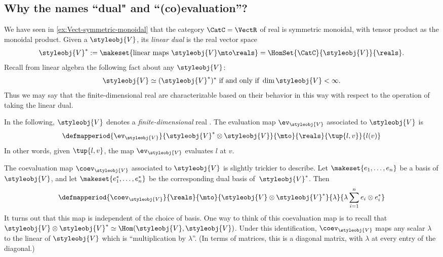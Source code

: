 \subsection{Why the names ``dual" and ``(co)evaluation''?}

We have seen in \cref{ex:Vect-symmetric-monoidal} that the category $\CatC = \VectR$ of real  is symmetric monoidal, with tensor product as the monoidal product.
Given a  $\styleobj{V} $, its \emph{linear dual} is the real vector space
\begin{equation}
    \label{eq:lin-dual-vecsp}
    \styleobj{V} ^{*} := \makeset{ \text{linear maps } \styleobj{V} \mto \reals } = \HomSet{\CatC}{\styleobj{V}}{ \reals}.
\end{equation}
%
Recall from linear algebra the following fact about any  $\styleobj{V} $:
%
\begin{equation}
    \label{eq:double-dual-fin-dim}
    \styleobj{V} \simeq (\styleobj{V} ^{*})^* \text{ if and only if } \dim \styleobj{V} < \infty.
\end{equation}
%
Thus we may say that the finite-dimensional real  are characterizable based on their behavior in this way with respect to the operation of taking the linear dual. 


In the following, $\styleobj{V} $ denotes a \emph{finite-dimensional} real .
The evaluation map $\ev_\styleobj{V} $ associated to $\styleobj{V} $ is
\begin{equation}
    \label{eq:evaluation-vecsp}
    \defmapperiod{
        \ev_\styleobj{V}
    }{
        \styleobj{V}^* \otimes \styleobj{V}
    }{
        \mto
    }{
        \reals
    }{
        \tup{l, v}
    }{
        l(v)
    }
\end{equation}
In other words, given $\tup{l, v}$, the map $\ev_\styleobj{V} $ evaluates $l$ at $v$.

The coevaluation map $\coev_\styleobj{V} $ associated to $\styleobj{V} $ is slightly trickier to describe.
Let $\makeset{e_1, \dots, e_n }$ be a basis of $\styleobj{V}$, and let $\makeset{e_1^*, \dots, e_n^* }$ be the corresponding dual basis of~$\styleobj{V}^*$.
Then
\begin{equation}
    \label{eq:coevaluation-vecsp}
    \defmapperiod{
        \coev_\styleobj{V}
    }{
        \reals
    }{
        \mto
    }{
        \styleobj{V} \otimes \styleobj{V}^*
    }{
        \lambda
    }{
        \lambda \sum_{i=1}^n e_i \otimes e_i^*
    }
\end{equation}
It turns out that this map is independent of the choice of basis.
One way to think of this coevaluation map is to recall that $\styleobj{V} \otimes \styleobj{V}^* \simeq \Hom(\styleobj{V}, \styleobj{V})$.
Under this identification, $\coev_\styleobj{V}$ maps any scalar $\lambda$ to the linear  of $\styleobj{V}$ which is ``multiplication by $\lambda$''.
(In terms of matrices, this is a diagonal matrix, with $\lambda$ at every entry of the diagonal.)

